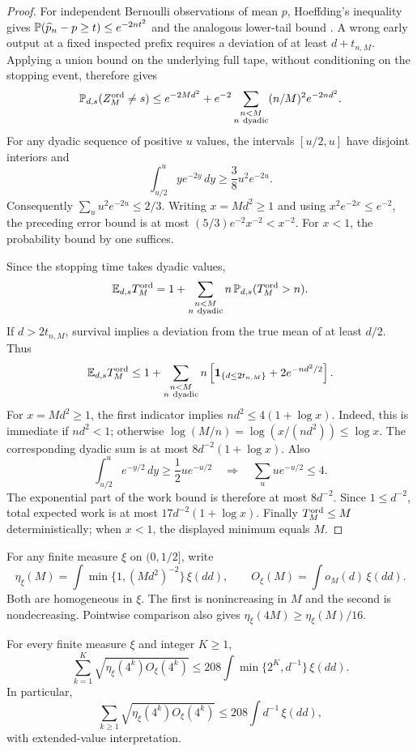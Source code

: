 \begin{proof}
For independent Bernoulli observations of mean $p$, Hoeffding's
inequality gives
$\mathbb P(\widehat p_n-p\ge t)\le e^{-2nt^2}$ and the analogous lower-tail
bound \cite{hoeffding}. A wrong early output at a fixed inspected prefix
requires a deviation of at least $d+t_{n,M}$. Applying a union bound on
the underlying full tape, without conditioning on the stopping event,
therefore gives
\[
 \mathbb P_{d,s}(Z_M^{\rm ord}\ne s)
 \le e^{-2Md^2}
       +e^{-2}\sum_{\substack{n<M\\n\ {\rm dyadic}}}
                    (n/M)^2e^{-2nd^2}.
\]
For any dyadic sequence of positive $u$ values, the intervals
$[u/2,u]$ have disjoint interiors and
\[
 \int_{u/2}^{u}y e^{-2y}\,dy
 \ge\frac38u^2e^{-2u}.
\]
Consequently $\sum_u u^2e^{-2u}\le2/3$.
Writing $x=Md^2\ge1$ and using $x^2e^{-2x}\le e^{-2}$, the preceding
error bound is at most $(5/3)e^{-2}x^{-2}<x^{-2}$. For $x<1$, the
probability bound by one suffices.

Since the stopping time takes dyadic values,
\[
 \mathbb E_{d,s}T_M^{\rm ord}
 =1+\sum_{\substack{n<M\\n\ {\rm dyadic}}}
                      n\,\mathbb P_{d,s}(T_M^{\rm ord}>n).
\]
If $d>2t_{n,M}$, survival implies a deviation from the true mean of
at least $d/2$. Thus
\[
 \mathbb E_{d,s}T_M^{\rm ord}
 \le1+\sum_{\substack{n<M\\n\ {\rm dyadic}}}
       n\left[\mathbf 1_{\{d\le2t_{n,M}\}}+2e^{-nd^2/2}\right].
\]
For $x=Md^2\ge1$, the first indicator implies
$nd^2\le4(1+\log x)$. Indeed, this is immediate if $nd^2<1$; otherwise
$\log(M/n)=\log(x/(nd^2))\le\log x$.
The corresponding dyadic sum is at most
$8d^{-2}(1+\log x)$.
Also
\[
 \int_{u/2}^{u}e^{-y/2}\,dy\ge\frac12u e^{-u/2}
 \quad\Longrightarrow\quad
 \sum_u u e^{-u/2}\le4.
\]
The exponential part of the work bound is therefore at most $8d^{-2}$.
Since $1\le d^{-2}$, total expected work is at most
$17d^{-2}(1+\log x)$. Finally $T_M^{\rm ord}\le M$ deterministically;
when $x<1$, the displayed minimum equals $M$.
\end{proof}

For any finite measure $\xi$ on $(0,1/2]$, write
\[
 \eta_\xi(M)=\int\min\{1,(Md^2)^{-2}\}\,\xi(dd),
 \qquad
 O_\xi(M)=\int o_M(d)\,\xi(dd).
\]
Both are homogeneous in $\xi$. The first is nonincreasing in $M$ and
the second is nondecreasing. Pointwise comparison also gives
$\eta_\xi(4M)\ge\eta_\xi(M)/16$.

\begin{lemma}\label{lem:uf-kernel}
For every finite measure $\xi$ and integer $K\ge1$,
\[
 \sum_{k=1}^{K}\sqrt{\eta_\xi(4^k)O_\xi(4^k)}
 \le208\int\min\{2^K,d^{-1}\}\,\xi(dd).
\]
In particular,
\begin{equation}\label{eq:uf-kernel-infinite}
 \sum_{k\ge1}\sqrt{\eta_\xi(4^k)O_\xi(4^k)}
 \le208\int d^{-1}\,\xi(dd),
\end{equation}
with extended-value interpretation.
\end{lemma}

